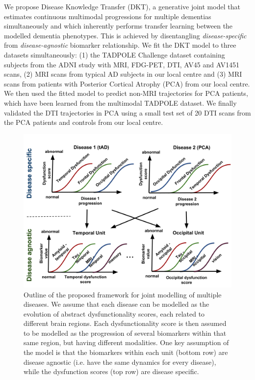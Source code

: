 \documentclass{llncs}
\begin{document}
We propose Disease Knowledge Transfer (DKT), a generative joint model that estimates continuous multimodal progressions for multiple dementias simultaneously and which inherently performs transfer learning between the modelled dementia phenotypes. This is achieved by disentangling \emph{disease-specific} from \emph{disease-agnostic} biomarker relationship. We fit the DKT model to three datasets simultaneously: (1) the TADPOLE Challenge dataset containing subjects from the ADNI study with MRI, FDG-PET, DTI, AV45 and AV1451 scans, (2) MRI scans from typical AD subjects in our local centre and (3) MRI scans from patients with Posterior Cortical Atrophy (PCA) from our local centre. We then used the fitted model to predict non-MRI trajectories for PCA patients, which have been learned from the multimodal TADPOLE dataset. We finally validated the DTI trajectories in PCA using a small test set of 20 DTI scans from the PCA patients and controls from our local centre.

% 
% 
% 
%


\begin{figure}[h]
 \centering
 \includegraphics[width=\textwidth]{figures/disease_knowledge_transfer.png}
 \caption{Outline of the proposed framework for joint modelling of multiple diseases. We assume that each disease can be modelled as the evolution of abstract dysfunctionality scores, each related to different brain regions. Each dysfunctionality score is then assumed to be modelled as the progression of several biomarkers within that same region, but having different modalities. One key assumption of the model is that the biomarkers within each unit (bottom row) are disease agnostic (i.e. have the same dynamics for every disease), while the dysfunction scores (top row) are disease specific.}
 \label{fig:diagram}
\end{figure}
\end{document}
